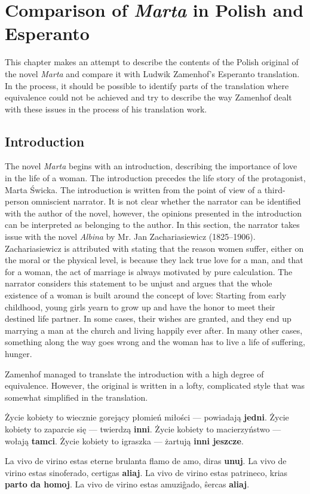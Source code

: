 \chapter{Comparison of \textit{Marta} in Polish and Esperanto}

This chapter makes an attempt to describe the contents of the Polish original of the novel \textit{Marta} and compare it with Ludwik Zamenhof's Esperanto translation.
In the process, it should be possible to identify parts of the translation where equivalence could not be achieved and try to describe the way Zamenhof dealt with these issues in the process of his translation work.

\section{Introduction}

The novel \textit{Marta} begins with an introduction, describing the importance of love in the life of a woman.
The introduction precedes the life story of the protagonist, Marta Świcka.
The introduction is written from the point of view of a third-person omniscient narrator.
It is not clear whether the narrator can be identified with the author of the novel, however, the opinions presented in the introduction can be interpreted as belonging to the author.
In this section, the narrator takes issue with the novel \textit{Albina} by Mr. Jan Zachariasiewicz (1825--1906).
Zachariasiewicz is attributed with stating that the reason women suffer, either on the moral or the physical level, is because they lack true love for a man, and that for a woman, the act of marriage is always motivated by pure calculation.
The narrator considers this statement to be unjust and argues that the whole existence of a woman is built around the concept of love: Starting from early childhood, young girls yearn to grow up and have the honor to meet their destined life partner.
In some cases, their wishes are granted, and they end up marrying a man at the church and living happily ever after.
In many other cases, something along the way goes wrong and the woman has to live a life of suffering, hunger.

Zamenhof managed to translate the introduction with a high degree of equivalence.
However, the original is written in a lofty, complicated style that was somewhat simplified in the translation.

Życie kobiety to wiecznie gorejący płomień miłości --- powiadają \textbf{jedni}.
Życie kobiety to zaparcie się --- twierdzą \textbf{inni}.
Życie kobiety to macierzyństwo --- wołają \textbf{tamci}.
Życie kobiety to igraszka --- żartują \textbf{inni jeszcze}.

La vivo de virino estas eterne brulanta flamo de amo, diras \textbf{unuj}. La vivo de virino estas sinoferado, certigas \textbf{aliaj}. La vivo de virino estas patrineco, krias \textbf{parto da homoj}. La vivo de virino estas amuzi\^gado, \^sercas \textbf{aliaj}.